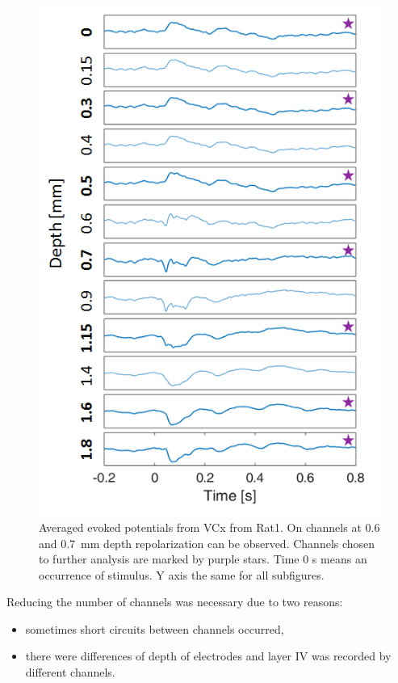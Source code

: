 \documentclass{pracalicmgr}
\begin{document}
   \begin{figure}[H]
   	\begin{center}
   		\includegraphics[scale=0.75]{wybieranie_kanalow3.png}
   	\end{center}
   	\caption{ Averaged evoked potentials from VCx from Rat1. On channels at 0.6 and 0.7~mm depth repolarization can be observed. Channels chosen to further analysis are marked by purple stars. Time 0 s means an occurrence of stimulus. Y axis the same for all subfigures.}
   	\label{rys:kanaly}
   \end{figure} 
   
   Reducing the number of channels was necessary due to two reasons:
   \begin{itemize}
   	\item sometimes short circuits between channels occurred,
   	\item there were differences of depth of electrodes and layer IV was recorded by different channels.
   \end{itemize} 
   
\end{document}
